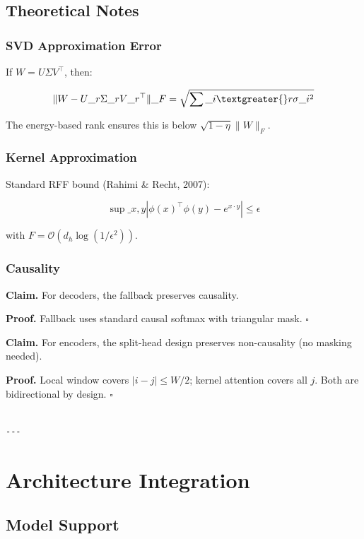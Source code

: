 \subsection{Theoretical Notes}

\subsubsection{SVD Approximation Error}

If $W = U\Sigma V^\top$, then:

\[
\|W - U\_r \Sigma\_r V\_r^\top\|\_F = \sqrt{\sum\_{i \textgreater{} r} \sigma\_i^2}
\]

The energy-based rank ensures this is below $\sqrt{1 - \eta} \|W\|_F$.

\subsubsection{Kernel Approximation}

Standard RFF bound (Rahimi \& Recht, 2007):

\[
\sup\_{x, y} |\phi(x)^\top \phi(y) - e^{x \cdot y}| \leq \epsilon
\]

with $F = \mathcal{O}(d_h \log(1/\epsilon^2))$.

\subsubsection{Causality}

\textbf{Claim.} For decoders, the fallback preserves causality.

\textbf{Proof.} Fallback uses standard causal softmax with triangular mask. $\square$

\textbf{Claim.} For encoders, the split-head design preserves non-causality 
(no masking needed).

\textbf{Proof.} Local window covers $|i - j| \leq W/2$; kernel attention covers 
all $j$. Both are bidirectional by design. $\square$
\begin{lstlisting}

---
\end{lstlisting}

\section{Architecture Integration}

\subsection{Model Support}

